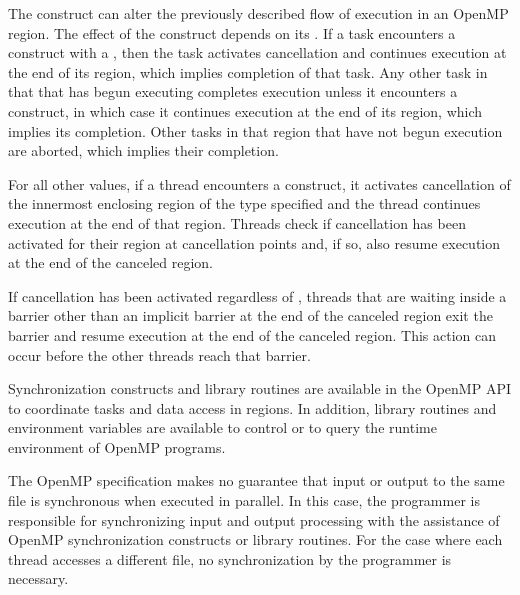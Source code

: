 The  construct can alter the previously described flow of execution 
in an OpenMP region. The effect of the  construct depends on its
. If a task encounters a  construct with 
a  , then the task activates cancellation 
and continues execution at the end of its  region, which implies 
completion of that task. Any other task in that  that has begun 
executing completes execution unless it encounters a 
 construct, in which case it continues execution at the end of its 
 region, which implies its completion. Other tasks in that 
 region that have not begun execution are aborted, which 
implies their completion.

For all other  values, if a thread encounters a 
 construct, it activates cancellation of the innermost enclosing 
region of the type specified and the thread continues execution at the end of 
that region. Threads check if cancellation has been activated for their region 
at cancellation points and, if so, also resume execution at
the end of the canceled region.

If cancellation has been activated regardless of ,
threads that are waiting inside a barrier other than an implicit barrier at 
the end of the canceled region exit the barrier and resume execution at the 
end of the canceled region. This action can occur before the other threads 
reach that barrier.

Synchronization constructs and library routines are available in the OpenMP 
API to coordinate tasks and data access in  regions. In addition, 
library routines and environment variables are available to control or to query 
the runtime environment of OpenMP programs.

The OpenMP specification makes no guarantee that input or output to the same file is
synchronous when executed in parallel. In this case, the programmer is responsible for
synchronizing input and output processing with the assistance of OpenMP
synchronization constructs or library routines. For the case where each thread 
accesses a different file, no synchronization by the programmer is necessary.
